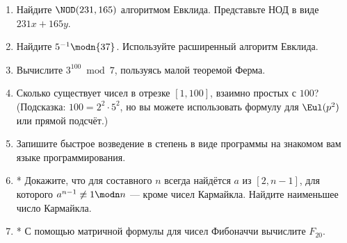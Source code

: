 \begin{tasksbox}
\begin{enumerate}
  \item Найдите $\NOD(231, 165)$ алгоритмом Евклида. Представьте НОД в виде $231 x + 165 y$.
  \item Найдите $5^{-1} \modn{37}$. Используйте расширенный алгоритм Евклида.
  \item Вычислите $3^{100} \bmod 7$, пользуясь малой теоремой Ферма.
  \item Сколько существует чисел в отрезке $[1, 100]$, взаимно простых с $100$? (Подсказка: $100 = 2^2\cdot 5^2$, но вы можете использовать формулу для $\Eul(p^2)$ или прямой подсчёт.)
  \item Запишите быстрое возведение в степень в виде программы на знакомом вам языке программирования.
  \item* Докажите, что для составного $n$ всегда найдётся $a$ из $[2, n-1]$, для которого $a^{n-1} \not\equiv 1 \modn n$ --- кроме чисел Кармайкла. Найдите наименьшее число Кармайкла.
  \item* С помощью матричной формулы для чисел Фибоначчи вычислите $F_{20}$.
\end{enumerate}
\end{tasksbox}
